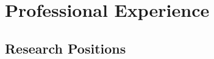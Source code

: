 \documentclass[11pt,a4paper,sans]{moderncv}
\begin{document}
\section{Professional Experience}
\subsection{Research Positions}
\end{document}
